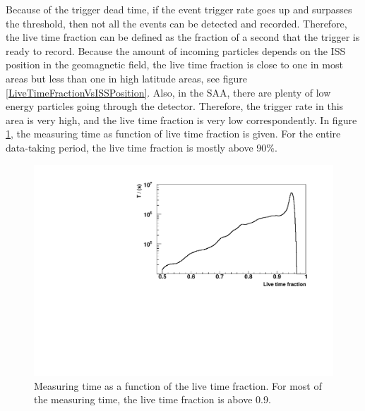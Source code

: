 Because of the trigger dead time, if the event trigger rate goes up and surpasses the threshold, then not all the events can be detected and recorded. Therefore, the live time fraction can be defined as the fraction of a second that the trigger is ready to record. Because the amount of incoming particles depends on the ISS position in the geomagnetic field, the live time fraction is close to one in most areas but less than one in high latitude areas, see figure \ref{LiveTimeFractionVsISSPosition}. Also, in the SAA, there are plenty of low energy particles going through the detector. Therefore, the trigger rate in this area is very high, and the live time fraction is very low correspondently. In figure \ref{MeasuringTimeVsLiveTime}, the measuring time as function of live time fraction is given. For the entire data-taking period, the live time fraction is mostly above 90\%.  \par


\begin{figure}[htpb]
\centering
\includegraphics[width=1.0\textwidth]{Figures/chapter4/MeasuringTime/MeasuringTimeVsLiveTime.pdf}
\caption[Measuring time as a function of the live time fraction.]{Measuring time as a function of the live time fraction. For most of the measuring time, the live time fraction is above 0.9.}
\label{MeasuringTimeVsLiveTime}
\end{figure}
 
